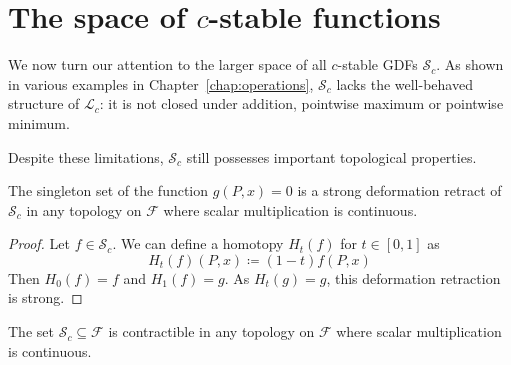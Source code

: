 \section{The space of $c$-stable functions}

We now turn our attention to the larger space of all $c$-stable GDFs
$\mathcal{S}_c$. As shown in various examples in Chapter~\ref{chap:operations},
$\mathcal{S}_c$ lacks the well-behaved structure of $\mathcal{L}_c$: it is not
closed under addition, pointwise maximum or pointwise minimum.

Despite these limitations, $\mathcal{S}_c$ still possesses important topological
properties.
\begin{theorem}
    The singleton set of the function $g(P, x) = 0$ is a strong deformation
    retract of $\mathcal{S}_c$ in any topology on $\mathcal{F}$ where scalar
    multiplication is continuous.
\end{theorem}
\begin{proof}
    Let $f \in \mathcal{S}_c$.
    We can define a homotopy $H_t(f)$ for $t \in [0, 1]$ as
    \begin{equation}
        H_t(f)(P, x) \coloneqq (1 - t)f(P, x)
    \end{equation}
    Then $H_0(f) = f$ and $H_1(f) = g$.
    As $H_t(g) = g$, this deformation retraction is strong.
\end{proof}
\begin{corollary}
    The set $\mathcal{S}_c \subseteq \mathcal{F}$ is contractible in any
    topology on $\mathcal{F}$ where scalar multiplication is continuous.
\end{corollary}

